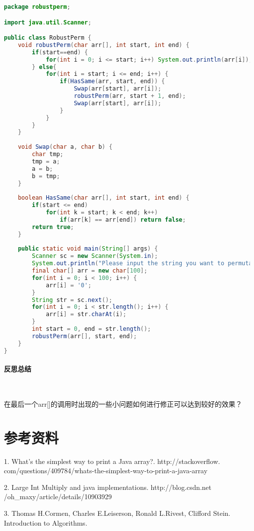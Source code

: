 \documentclass[UTF8]{ctexart}
\begin{document}
\begin{small}
\begin{lstlisting}[language=java]
package robustperm;

import java.util.Scanner;

public class RobustPerm {
	void robustPerm(char arr[], int start, int end) {
		if(start==end) {
			for(int i = 0; i <= start; i++) System.out.println(arr[i]);
		} else{
			for(int i = start; i <= end; i++) {
				if(HasSame(arr, start, end)) {
					Swap(arr[start], arr[i]);
					robustPerm(arr, start + 1, end);
					Swap(arr[start], arr[i]);
				}
			}
		}
	}
	
	void Swap(char a, char b) {
		char tmp;
		tmp = a;
		a = b;
		b = tmp;
	}
	
	boolean HasSame(char arr[], int start, int end) {
		if(start <= end)
			for(int k = start; k < end; k++)
				if(arr[k] == arr[end]) return false;
		return true;
	}
	
	public static void main(String[] args) {
		Scanner sc = new Scanner(System.in);
		System.out.println("Please input the string you want to permutaion:");
		final char[] arr = new char[100];
		for(int i = 0; i < 100; i++) {
			arr[i] = '0';
		}
		String str = sc.next();
		for(int i = 0; i < str.length(); i++) {
			arr[i] = str.charAt(i);
		}
		int start = 0, end = str.length();
		robustPerm(arr[], start, end);
	}
}
\end{lstlisting}
\end{small}

    \paragraph{反思总结}

    ~

    在最后一个arr[]的调用时出现的一些小问题如何进行修正可以达到较好的效果？

    \section{参考资料}
    1. What's the simplest way to print a Java array?. http://stackoverflow.
    com/questions/409784/whats-the-simplest-way-to-print-a-java-array

    2. Large Int Multiply and java implementations. http://blog.csdn.net
    /oh\_maxy/article/details/10903929

    3. Thomas H.Cormen, Charles E.Leiserson, Ronald L.Rivest, Clifford Stein. Introduction to Algorithms.
\end{document}
